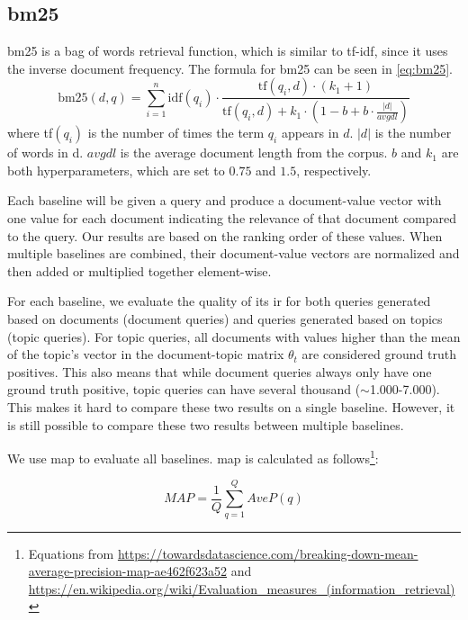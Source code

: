 \subsection{\acrlong{bm25}}
\gls{bm25} is a bag of words retrieval function, which is similar to \gls{tf-idf}, since it uses the inverse document frequency.
The formula for \gls{bm25} can be seen in \autoref{eq:bm25}\cite{bm25}.
\begin{equation}\label{eq:bm25}
\text{bm25}(d, q) = \sum_{i=1}^{n}\text{idf}(q_i) \cdot \frac{\text{tf}(q_i, d) \cdot (k_1 + 1)}{\text{tf}(q_i, d) + k_1 \cdot (1 - b + b \cdot \frac{|d|}{avgdl})}
\end{equation}
where tf$(q_i)$ is the number of times the term $q_i$ appears in $d$.
$|d|$ is the number of words in d. 
$avgdl$ is the average document length from the corpus.
$b$ and $k_1$ are both hyperparameters, which are set to $0.75$ and $1.5$, respectively.
 
Each baseline will be given a query and produce a document-value vector with one value for each document indicating the relevance of that document compared to the query.
Our results are based on the ranking order of these values.
When multiple baselines are combined, their document-value vectors are normalized and then added or multiplied together element-wise.

For each baseline, we evaluate the quality of its \gls{ir} for both queries generated based on documents (document queries) and queries generated based on topics (topic queries).
For topic queries, all documents with values higher than the mean of the topic's vector in the document-topic matrix $\theta_t$ are considered ground truth positives.
This also means that while document queries always only have one ground truth positive, topic queries can have several thousand ($\sim$1.000-7.000).
This makes it hard to compare these two results on a single baseline.
However, it is still possible to compare these two results between multiple baselines.

We use \gls{map} to evaluate all baselines\cite{other_map}.
\Gls{map} is calculated as follows\footnote{Equations from \url{https://towardsdatascience.com/breaking-down-mean-average-precision-map-ae462f623a52} and \url{https://en.wikipedia.org/wiki/Evaluation_measures_(information_retrieval)}}:

\begin{equation}
	MAP = \frac{1}{Q}\sum_{q=1}^{Q} AveP(q)
\end{equation}

